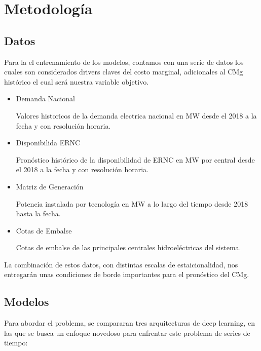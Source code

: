\documentclass[twocolumn]{article}
\begin{document}
\section{Metodología}

\subsection{Datos}
Para la el entrenamiento de los modelos, contamos con una serie de datos
los cuales son considerados drivers claves del costo marginal, adicionales al CMg histórico
el cual será nuestra variable objetivo.

\begin{itemize}
    \item Demanda Nacional
    
    Valores historicos de la demanda electrica nacional en MW desde el 2018 a la fecha y con
	resolución horaria.

    \item Disponibilida ERNC
    
    Pronóstico histórico de la disponibilidad de ERNC en MW por central 
	desde el 2018 a la fecha y con
	resolución horaria.

    \item Matriz de Generación
    
	Potencia instalada por tecnología en MW a lo largo del tiempo desde 2018 hasta la fecha.

    \item Cotas de Embalse
    
	Cotas de embalse de las principales centrales hidroeléctricas del sistema.
\end{itemize}

La combinación de estos datos, con distintas escalas de estaicionalidad, nos entregarán unas condiciones
de borde importantes para el pronóstico del CMg.

\subsection{Modelos}
Para abordar el problema, se compararan tres arquitecturas de deep learning, en las que se busca
un enfoque novedoso para enfrentar este problema de series de tiempo:
\end{document}
